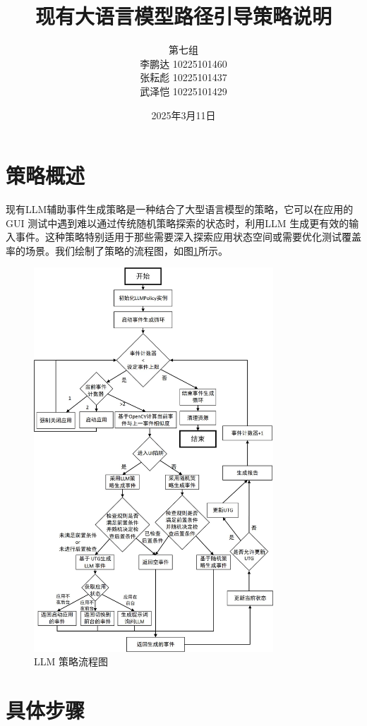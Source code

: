 \documentclass[UTF8, fontset=windows]{article}
\title{\textbf{现有大语言模型路径引导策略说明}}
\author{第七组 \\ 
李鹏达 10225101460 \\
张耘彪 10225101437 \\
武泽恺 10225101429
}
\date{2025年3月11日}
\begin{document}
\maketitle

\section*{策略概述}

现有LLM辅助事件生成策略是一种结合了大型语言模型的策略，它可以在应用的GUI 测试中遇到难以通过传统随机策略探索的状态时，利用LLM 生成更有效的输入事件。这种策略特别适用于那些需要深入探索应用状态空间或需要优化测试覆盖率的场景。我们绘制了策略的流程图，如图\ref{fig:llm_strategy}所示。

\begin{figure}[h!]
    \centering
    \includegraphics[width=0.8\textwidth]{software_practice_1.jpg}
    \caption{LLM 策略流程图}
    \label{fig:llm_strategy}
\end{figure}

\section*{具体步骤}
\end{document}
